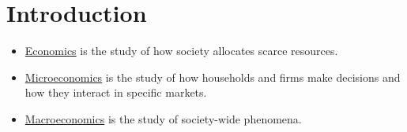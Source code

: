 \setcounter{chapter}{-1}
\chapter{Introduction}

\begin{itemize}
	
	\item \underline{Economics} is the study of how society allocates scarce resources.

	\item \underline{Microeconomics} is the study of how households and firms make decisions and how they interact in specific markets.

	\item \underline{Macroeconomics} is the study of society-wide phenomena.
	
\end{itemize}

\renewcommand{\chaptername}{Chapter}